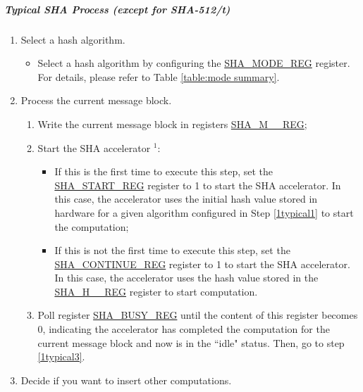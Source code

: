 \documentclass[main\_\_EN.tex]{subfiles}
\begin{document}
\subparagraph{Typical SHA Process (except for SHA-512/{\it{t}})}
\begin{enumerate}
    \item Select a hash algorithm.\label{1typical1}
        \begin{itemize}
            \item Select a hash algorithm by configuring the \hyperref[regdesc:SHAMODEREG]{SHA\_MODE\_REG} register. For details, please refer to Table \ref{table:mode summary}.
        \end{itemize}

    \item Process the current message block\label{1typical2}.
        \begin{enumerate}
            \item Write the current message block in registers \hyperref[regdesc:SHAMNREG]{SHA\_M\_\_REG};
            \item Start the SHA accelerator\label{2b2} \hyperref[note1]{$^1$}:
            \begin{itemize}
                \item If this is the first time to execute this step, set the \hyperref[regdesc:SHASTARTREG]{SHA\_START\_REG} register to 1 to start the SHA accelerator. In this case, the accelerator uses the initial hash value stored in hardware for a given algorithm configured in Step \ref{1typical1} to start the computation;
                \item If this is not the first time to execute this step, set the \hyperref[regdesc:SHACONTINUEREG]{SHA\_CONTINUE\_REG} register to 1 to start the SHA accelerator. In this case, the accelerator uses the hash value stored in the \hyperref[regdesc:SHAHNREG]{SHA\_H\_\_REG} register to start computation.
            \end{itemize}
            \item Poll register \hyperref[regdesc:SHABUSYREG]{SHA\_BUSY\_REG} until the content of this register becomes 0, indicating the accelerator has completed the computation for the current message block and now is in the ``idle" status. Then, go to step \ref{1typical3}.
        \end{enumerate}
    \item \label{1typical3} Decide if you want to insert other computations.
        \begin{itemize}

\end{itemize}
\end{enumerate}
\end{document}
